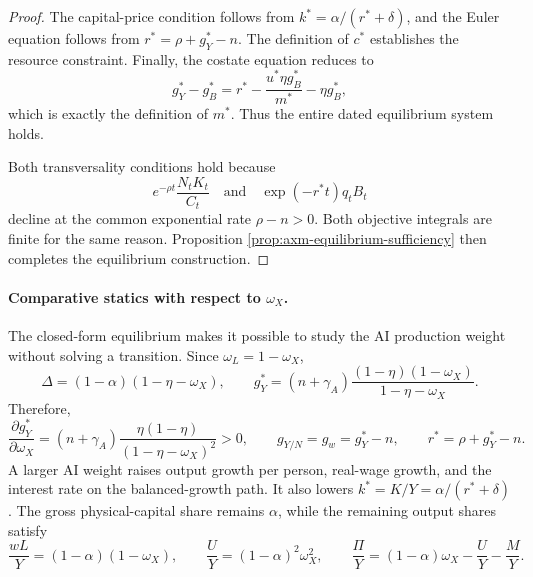 \begin{proof}
The capital-price condition follows from \(k^*=\alpha/(r^*+\delta)\), and the
Euler equation follows from \(r^*=\rho+g_Y^*-n\). The definition of \(c^*\)
establishes the resource constraint. Finally, the costate equation reduces to
\[
 g_Y^*-g_B^*
 =r^*-\frac{u^*\eta g_B^*}{m^*}-\eta g_B^*,
\]
which is exactly the definition of \(m^*\). Thus the entire dated equilibrium
system holds.

Both transversality conditions hold because
\[
 e^{-\rho t}\frac{N_tK_t}{C_t}
 \quad\text{and}\quad
 \exp(-r^*t)q_tB_t
\]
decline at the common exponential rate \(\rho-n>0\). Both objective integrals
are finite for the same reason. Proposition
\ref{prop:axm-equilibrium-sufficiency} then completes the equilibrium
construction.
\end{proof}

\paragraph{Comparative statics with respect to \(\omega_X\).}
The closed-form equilibrium makes it possible to study the AI production
weight without solving a transition. Since \(\omega_L=1-\omega_X\),
\begin{equation}
 \Delta=(1-\alpha)(1-\eta-\omega_X),
 \qquad
 g_Y^*=(n+\gamma_A)\frac{(1-\eta)(1-\omega_X)}
 {1-\eta-\omega_X}.
 \label{eq:axm-bgp-omega-growth}
\end{equation}
Therefore,
\begin{equation}
 \frac{\partial g_Y^*}{\partial\omega_X}
 =(n+\gamma_A)\frac{\eta(1-\eta)}{(1-\eta-\omega_X)^2}>0,
 \qquad
 g_{Y/N}=g_w=g_Y^*-n,
 \qquad
 r^*=\rho+g_Y^*-n.
 \label{eq:axm-bgp-omega-growth-derivative}
\end{equation}
A larger AI weight raises output growth per person, real-wage growth, and the
interest rate on the balanced-growth path. It also lowers
\(k^*=K/Y=\alpha/(r^*+\delta)\). The gross physical-capital share remains
\(\alpha\), while the remaining output shares satisfy
\begin{equation}
 \frac{wL}{Y}=(1-\alpha)(1-\omega_X),\qquad
 \frac{U}{Y}=(1-\alpha)^2\omega_X^2,\qquad
 \frac{\Pi}{Y}=(1-\alpha)\omega_X-\frac{U}{Y}-\frac{M}{Y}.
 \label{eq:axm-bgp-omega-distribution}
\end{equation}

